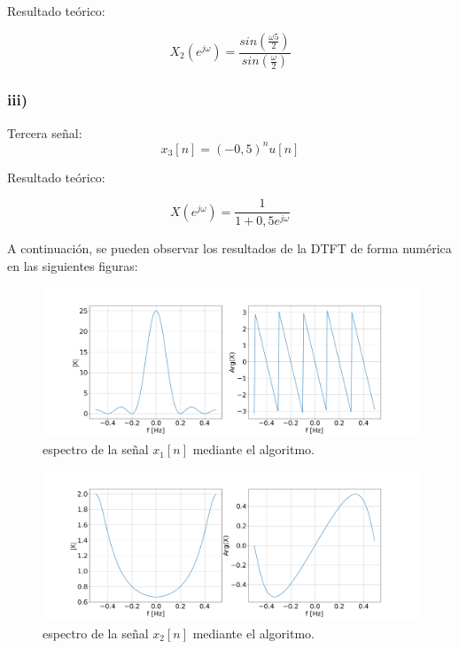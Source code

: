 \documentclass[11pt,a4paper]{article}
\begin{document}
    Resultado teórico:
    
    \begin{equation}
    X_{2}(e^{j \omega})= \frac{sin(\frac{ \omega 5}{2})}{sin (\frac{\omega}{2})}
    \end{equation}

    \subsubsection*{iii)}
    Tercera señal:
    \begin{equation} 
        x_{3}[n]=(-0,5)^{n}u[n]
    \end{equation}
    
    Resultado teórico:
    
    \begin{equation}
    X(e^{j \omega})=\frac{1}{1+0,5 e^{j \omega}}
    \end{equation}
    
    A continuación, se pueden observar los resultados de la DTFT de forma numérica en las siguientes figuras:
    
    \begin{figure}[H]
    \centering
    \includegraphics[width=\textwidth]{Img/punto_3_e_1.png}
    \caption{espectro de la señal $x_{1}[n]$ mediante el algoritmo.}
    \label{fig.3ei}
    \end{figure} 


    \begin{figure}[H]
    \centering
    \includegraphics[width=\textwidth]{Img/punto_3_e_3.png}
    \caption{espectro de la señal $x_{2}[n]$ mediante el algoritmo.}
    \label{fig.3eii}
    \end{figure}
\end{document}
